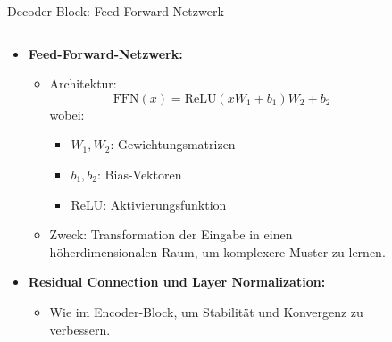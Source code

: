 \documentclass[aspectratio=1610, xcolor=dvipsnames, 9pt]{beamer}
\begin{document}
\begin{frame}{Decoder-Block: Feed-Forward-Netzwerk}
  \begin{columns}
    \begin{column}{0.7\textwidth}
      \begin{itemize}
        \item \textbf{Feed-Forward-Netzwerk:}
          \begin{itemize}
            \item Architektur:
              \[
              \text{FFN}(x) = \text{ReLU}(xW_1 + b_1)W_2 + b_2
              \]
              wobei:
              \begin{itemize}
                \item \( W_1, W_2 \): Gewichtungsmatrizen
                \item \( b_1, b_2 \): Bias-Vektoren
                \item ReLU: Aktivierungsfunktion
              \end{itemize}
            \item Zweck: Transformation der Eingabe in einen höherdimensionalen Raum, um komplexere Muster zu lernen.
          \end{itemize}
        \item \textbf{Residual Connection und Layer Normalization:}
          \begin{itemize}
            \item Wie im Encoder-Block, um Stabilität und Konvergenz zu verbessern.
          \end{itemize}
      \end{itemize}
    \end{column}
    \begin{column}{0.3\textwidth}
      \begin{figure}
        \centering

\end{figure}
\end{column}
\end{columns}
\end{frame}
\end{document}
